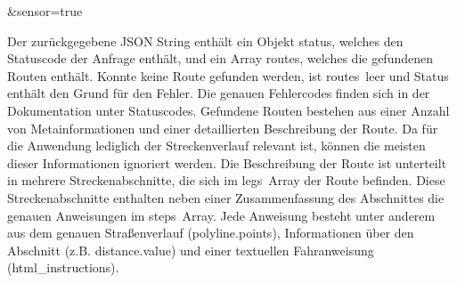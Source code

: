 \&sensor=true

Der zurückgegebene JSON String enthält ein Objekt \glqq status\grqq, welches den Statuscode der Anfrage enthält, und ein Array \glqq routes\grqq, welches die gefundenen Routen enthält. Konnte keine Route gefunden werden, ist \glqq routes\grqq\ leer und Status enthält den Grund für den Fehler. Die genauen Fehlercodes finden sich in der Dokumentation unter \glqq Statuscodes\grqq. Gefundene Routen bestehen aus einer Anzahl von Metainformationen und einer detaillierten Beschreibung der Route. Da für die Anwendung lediglich der Streckenverlauf relevant ist, können die meisten dieser Informationen ignoriert werden. Die Beschreibung der Route ist unterteilt in mehrere Streckenabschnitte, die sich im \glqq legs\grqq\ Array der Route befinden. Diese Streckenabschnitte enthalten neben einer Zusammenfassung des Abschnittes die genauen Anweisungen im \glqq steps\grqq\ Array. Jede Anweisung besteht unter anderem aus dem genauen Straßenverlauf (\glqq polyline.points\grqq), Informationen über den Abschnitt (z.B. \glqq distance.value\grqq) und einer textuellen Fahranweisung (\glqq html\_instructions\grqq).

